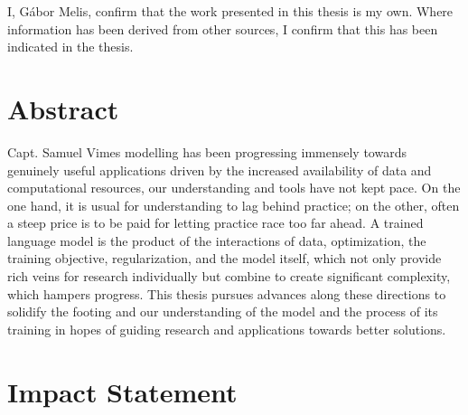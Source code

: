 \documentclass[12pt,a4paper,oneside]{book}
\begin{document}
\begin{titlepage}
\vspace*{16\groundskip}
\noindent I, Gábor Melis, confirm that the work presented in this thesis is my own.
Where information has been derived from other sources, I confirm that this has been indicated in the thesis.
\end{titlepage}

\setcounter{page}{3}

\chapter*{Abstract}

%
            {Capt. Samuel Vimes}
modelling has been progressing immensely towards genuinely useful applications driven by the increased availability of data and computational resources, our understanding and tools have not kept pace.
On the one hand, it  is usual for understanding to lag behind practice; on the other, often a steep price is to be paid for letting practice race too far ahead.
A trained language model is the product of the interactions of data, optimization, the training objective, regularization, and the model itself, which not only provide rich veins for research individually but combine to create significant complexity, which hampers progress.
This thesis pursues advances along these directions to solidify the footing and our understanding of the model and the process of its training in hopes of guiding research and applications towards better solutions.


\chapter*{Impact Statement}
\end{document}
